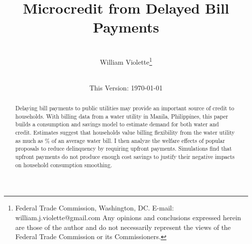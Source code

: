 \documentclass[12pt]{article}
\begin{document}
\begin{titlepage} 
\title{{Microcredit from Delayed Bill Payments}}
\author{\\[3em]
  William Violette\thanks{Federal Trade Commission, Washington, DC. E-mail: william.j.violette@gmail.com   Any opinions and conclusions expressed herein are those of the author and do not necessarily represent the views of the Federal Trade Commission or its Commissioners.} \\
 \\ 
  }
\vspace{30mm}
\date{\vspace{5mm}This Version: \today}
\maketitle
\begin{abstract}

Delaying bill payments to public utilities may provide an important source of credit to households.  With billing data from a water utility in Manila, Philippines, this paper builds a consumption and savings model to estimate demand for both water and credit.  Estimates suggest that households value billing flexibility from the water utility as much as \unskip\% of an average water bill.  I then analyze the welfare effects of popular proposals to reduce delinquency by requiring upfront payments.  Simulations find that upfront payments do not produce enough cost savings to justify their negative impacts on household consumption smoothing.






\end{abstract}
\end{titlepage}
\end{document}
